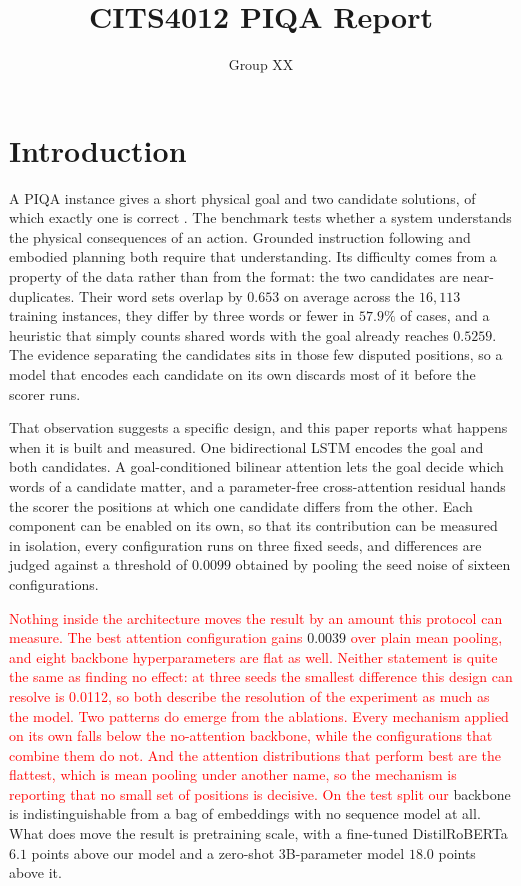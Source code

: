 \documentclass[11pt]{article}
\title{CITS4012 PIQA Report}
\author{Group XX}
\begin{document}
\maketitle

\section{Introduction}

A PIQA instance gives a short physical goal and two candidate solutions, of which exactly one is correct \citep{bisk2020piqa}. The benchmark tests whether a system understands the physical consequences of an action. Grounded instruction following and embodied planning both require that understanding. Its difficulty comes from a property of the data rather than from the format: the two candidates are near-duplicates. Their word sets overlap by $0.653$ on average across the $16,113$ training instances, they differ by three words or fewer in $57.9\%$ of cases, and a heuristic that simply counts shared words with the goal already reaches $0.5259$. The evidence separating the candidates sits in those few disputed positions, so a model that encodes each candidate on its own discards most of it before the scorer runs.

That observation suggests a specific design, and this paper reports what happens when it is built and measured. One bidirectional LSTM encodes the goal and both candidates. A goal-conditioned bilinear attention lets the goal decide which words of a candidate matter, and a parameter-free cross-attention residual hands the scorer the positions at which one candidate differs from the other. Each component can be enabled on its own, so that its contribution can be measured in isolation, every configuration runs on three fixed seeds, and differences are judged against a threshold of $0.0099$ obtained by pooling the seed noise of sixteen configurations.

\textcolor{red}{Nothing inside the architecture moves the result by an amount this protocol can measure. The best attention configuration gains } $0.0039$ \textcolor{red}{ over plain mean pooling, and eight backbone hyperparameters are flat as well. Neither statement is quite the same as finding no effect: at three seeds the smallest difference this design can resolve is 0.0112, so both describe the resolution of the experiment as much as the model. Two patterns do emerge from the ablations. Every mechanism applied on its own falls below the no-attention backbone, while the configurations that combine them do not. And the attention distributions that perform best are the flattest, which is mean pooling under another name, so the mechanism is reporting that no small set of positions is decisive. On the test split our }backbone is indistinguishable from a bag of embeddings with no sequence model at all. What does move the result is pretraining scale, with a fine-tuned DistilRoBERTa $6.1$ points above our model and a zero-shot 3B-parameter model $18.0$ points above it.
\end{document}

